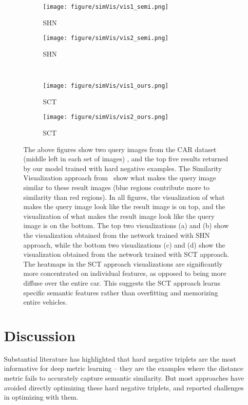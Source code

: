 \documentclass[runningheads]{llncs}
\begin{document}
\begin{figure}[t]
\centering
    \begin{subfigure}[1]{.49\textwidth}
    \centering
    \texttt{[image: figure/simVis/vis1\_semi.png]}
    \caption{SHN}
    \end{subfigure}
    \begin{subfigure}[2]{.49\textwidth}
    \centering
    \texttt{[image: figure/simVis/vis2\_semi.png]}
    \caption{SHN}
    \end{subfigure}
    \\
    \begin{subfigure}[3]{.49\textwidth}
    \centering
    \texttt{[image: figure/simVis/vis1\_ours.png]}
    \caption{SCT}
    \end{subfigure}
    \begin{subfigure}[4]{.49\textwidth}
    \centering
    \texttt{[image: figure/simVis/vis2\_ours.png]}
    \caption{SCT}
    \end{subfigure} 
    \caption{The above figures show two query images from the CAR dataset (middle left in each set of images) , and the top five results returned by our model trained with hard negative examples. The Similarity Visualization approach from~\cite{stylianouSimVis2019} show what makes the query image similar to these result images (blue regions contribute more to similarity than red regions). In all figures, the visualization of what makes the query image look like the result image is on top, and the visualization of what makes the result image look like the query image is on the bottom. The top two visualizations (a) and (b) show the visualization obtained from the network trained with SHN approach, while the bottom two visualizations (c) and (d) show the visualization obtained from the network trained with SCT approach. The heatmaps in the SCT approach visualizations are significantly more concentrated on individual features, as opposed to being more diffuse over the entire car. This suggests the SCT approach learns specific semantic features rather than overfitting and memorizing entire vehicles.}
    \label{fig:simvis}
\end{figure}

\section{Discussion}
Substantial literature has highlighted that hard negative triplets are the most informative for deep metric learning -- they are the examples where the distance metric fails to accurately capture semantic similarity. But most approaches have avoided directly optimizing these hard negative triplets, and reported challenges in optimizing with them.
\end{document}
